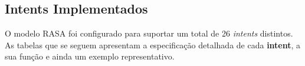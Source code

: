\documentclass{report}
\begin{document}

\subsection{Intents Implementados}

O modelo RASA foi configurado para suportar um total de 26 \textit{intents} distintos. As tabelas que se seguem apresentam a especificação detalhada de cada \textbf{intent}, a sua função e ainda um exemplo representativo.
\end{document}
